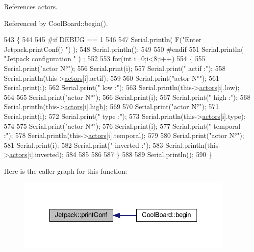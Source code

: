 References actors.



Referenced by Cool\+Board\+::begin().


\begin{DoxyCode}
543 \{
544 
545 \textcolor{preprocessor}{#if DEBUG == 1 }
546 
547     Serial.println( F(\textcolor{stringliteral}{"Enter Jetpack.printConf() "}) );
548     Serial.println();
549 
550 \textcolor{preprocessor}{#endif }
551     Serial.println( \textcolor{stringliteral}{"Jetpack configuration "} ) ;
552  
553         \textcolor{keywordflow}{for}(\textcolor{keywordtype}{int} i=0;i<8;i++)
554     \{   
555         Serial.print(\textcolor{stringliteral}{"actor N°"});
556         Serial.print(i);
557         Serial.print(\textcolor{stringliteral}{" actif :"});
558         Serial.println(this->\hyperlink{classJetpack_a7e16d2f97837f9712a2e6de1c50d99db}{actors}[i].actif);
559 
560         Serial.print(\textcolor{stringliteral}{"actor N°"});
561         Serial.print(i);
562         Serial.print(\textcolor{stringliteral}{" low :"});
563         Serial.println(this->\hyperlink{classJetpack_a7e16d2f97837f9712a2e6de1c50d99db}{actors}[i].low);
564 
565         Serial.print(\textcolor{stringliteral}{"actor N°"});
566         Serial.print(i);
567         Serial.print(\textcolor{stringliteral}{" high :"});
568         Serial.println(this->\hyperlink{classJetpack_a7e16d2f97837f9712a2e6de1c50d99db}{actors}[i].high);
569 
570         Serial.print(\textcolor{stringliteral}{"actor N°"});
571         Serial.print(i);
572         Serial.print(\textcolor{stringliteral}{" type :"});
573         Serial.println(this->\hyperlink{classJetpack_a7e16d2f97837f9712a2e6de1c50d99db}{actors}[i].type);
574         
575         Serial.print(\textcolor{stringliteral}{"actor N°"});
576         Serial.print(i);
577         Serial.print(\textcolor{stringliteral}{" temporal :"});
578         Serial.println(this->\hyperlink{classJetpack_a7e16d2f97837f9712a2e6de1c50d99db}{actors}[i].temporal);
579 
580         Serial.print(\textcolor{stringliteral}{"actor N°"});
581         Serial.print(i);
582         Serial.print(\textcolor{stringliteral}{" inverted :"});
583         Serial.println(this->\hyperlink{classJetpack_a7e16d2f97837f9712a2e6de1c50d99db}{actors}[i].inverted);
584 
585  
586 
587     \}
588 
589     Serial.println();
590 \}
\end{DoxyCode}
Here is the caller graph for this function\+:
\nopagebreak
\begin{figure}[H]
\begin{center}
\leavevmode
\includegraphics[width=305pt]{classJetpack_ac54a7bb4f9166bee32052253d9b1d306_icgraph}
\end{center}
\end{figure}
\mbox{\label{classJetpack_a338f1af8cbc6504ac69b47c7328569b5}} 
